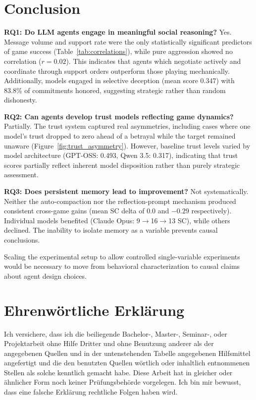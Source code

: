 \documentclass[a4paper,oneside,bibliography=totoc]{scrartcl}
\begin{document}
\section{Conclusion}

\textbf{RQ1: Do LLM agents engage in meaningful social reasoning?} Yes. Message volume and support rate were the only statistically significant predictors of game success (Table~\ref{tab:correlations}), while pure aggression showed no correlation ($r = 0.02$). This indicates that agents which negotiate actively and coordinate through support orders outperform those playing mechanically. Additionally, models engaged in selective deception (mean score 0.347) with 83.8\% of commitments honored, suggesting strategic rather than random dishonesty.

\textbf{RQ2: Can agents develop trust models reflecting game dynamics?} Partially. The trust system captured real asymmetries, including cases where one model's trust dropped to zero ahead of a betrayal while the target remained unaware (Figure~\ref{fig:trust_asymmetry}). However, baseline trust levels varied by model architecture (GPT-OSS: 0.493, Qwen 3.5: 0.317), indicating that trust scores partially reflect inherent model disposition rather than purely strategic assessment.

\textbf{RQ3: Does persistent memory lead to improvement?} Not systematically. Neither the auto-compaction nor the reflection-prompt mechanism produced consistent cross-game gains (mean SC delta of 0.0 and $-0.29$ respectively). Individual models benefited (Claude Opus: 9$\rightarrow$16$\rightarrow$13 SC), while others declined. The inability to isolate memory as a variable prevents causal conclusions.

\noindent Scaling the experimental setup to allow controlled single-variable experiments would be necessary to move from behavioral characterization to causal claims about agent design choices.



\clearpage
\section*{Ehrenw\"ortliche Erkl\"arung}

Ich versichere, dass ich die beiliegende Bachelor-, Master-, Seminar-, oder
Projektarbeit ohne Hilfe Dritter und ohne Benutzung anderer als der angegebenen
Quellen und in der untenstehenden Tabelle angegebenen Hilfsmittel angefertigt
und die den benutzten Quellen w\"ortlich oder inhaltlich entnommenen Stellen als
solche kenntlich gemacht habe. Diese Arbeit hat in gleicher oder \"ahnlicher Form
noch keiner Pr\"ufungsbeh\"orde vorgelegen. Ich bin mir bewusst, dass eine falsche
Erkl\"arung rechtliche Folgen haben wird.
\end{document}
